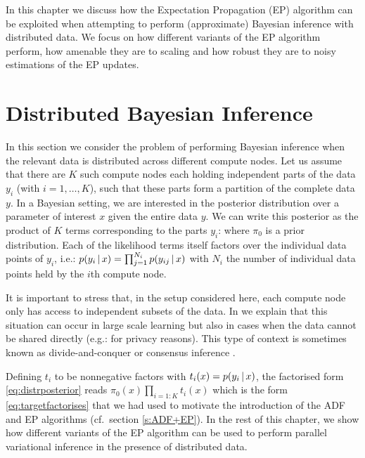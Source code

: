 
In this chapter we discuss how the Expectation Propagation (EP) algorithm can be exploited when attempting to perform (approximate) Bayesian inference with distributed data. 
We focus on how different variants of the EP algorithm perform, how amenable they are to scaling and how robust they are to noisy estimations of the EP updates. 

\section{Distributed Bayesian Inference}

In this section we consider the problem of performing Bayesian inference when the relevant data is distributed across different compute nodes. 
Let us assume that there are $K$ such compute nodes each holding independent parts of the data $y_i$ (with $i=1,\dots,K$), such that these parts form a partition of the complete data $y$. 
In a Bayesian setting, we are interested in the posterior distribution over a parameter of interest $x$ given the entire data $y$. We can write this posterior as the product of $K$ terms corresponding to the parts $y_i$: 
%
%
where $\pi_0$ is a prior distribution. Each of the likelihood terms itself factors over the individual data points of $y_i$, i.e.: $p(y_i\,|\, x)=\prod_{j=1}^{N_i}p(y_{ij}\,|\, x)$ with $N_i$ the number of individual data points held by the $i$th compute node.

It is important to stress that, in the setup considered here, each compute node only has access to independent subsets of the data. In \citet{hasenclever16} we explain that this situation can occur in large scale learning but also in cases when the data cannot be shared directly (e.g.: for privacy reasons). This type of context is sometimes known as divide-and-conquer or consensus inference \citep{kleiner14,battey15,zhao16}. 

Defining $t_i$ to be nonnegative factors with $t_i(x)=p(y_i\,|\, x)$, the factorised form \eqref{eq:distrposterior} reads $\pi_0(x)\prod_{i=1:K}t_i(x)$ which is the form \eqref{eq:targetfactorises} that we had used to motivate the introduction of the ADF and EP algorithms (cf.\ section \ref{s:ADF+EP}).
In the rest of this chapter, we show how different variants of the EP algorithm can be used to perform parallel variational inference in the presence of distributed data. 


